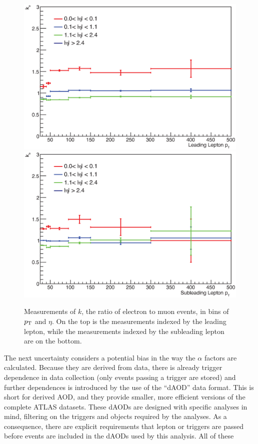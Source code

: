 \begin{centering}
\begin{figure}[bth]
\myfloatalign
\includegraphics[width=.85\linewidth]{figures/fs/data_efficiencies_2j_Z_lep0.eps}
\includegraphics[width=.85\linewidth]{figures/fs/data_efficiencies_2j_Z_lep1.eps}
\caption{Measurements of $k$, the ratio of electron to muon events, in bins of $p_{\text{T}}$ and $\eta$. On the top is the measurements indexed by the leading lepton, while the measurements indexed by the subleading lepton are on the bottom.}
\label{fig:fs_k}
\end{figure}
\end{centering}

The next uncertainty considers a potential bias in the way the $\alpha$ factors are calculated. Because they are derived from data, there is already trigger dependence in data collection (only events passing a trigger are stored) and further dependences is introduced by the use of the ``dAOD'' data format. This is short for derived \ac{AOD}, and they provide smaller, more efficient versions of the complete ATLAS datasets. These dAODs are designed with specific analyses in mind, filtering on the triggers and objects required by the analyses. As a consequence, there are explicit requirements that lepton or \met triggers are passed before events are included in the dAODs used by this analysis. All of these  



